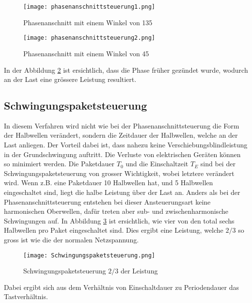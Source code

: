 \begin{figure}[ht!]
	\centering
	\texttt{[image: phasenanschnittsteuerung1.png]}	
	\caption{Phasenanschnitt mit einem Winkel von 135\textdegree \cite{Phasenanschnittsteuerung}}\label{fig:Phasenanschnitt1}
\end{figure}
\newpage
\begin{figure}[ht!]
	\centering
	\texttt{[image: phasenanschnittsteuerung2.png]}	
	\caption{Phasenanschnitt mit einem Winkel von 45\textdegree \cite{Phasenanschnittsteuerung}}\label{fig:Phasenanschnitt2}
\end{figure}

In der Abbildung \ref{fig:Phasenanschnitt2} ist ersichtlich, dass die Phase früher gezündet wurde, wodurch an der Last eine grössere Leistung resultiert.



\subsection{Schwingungspaketsteuerung}\label{sec:Schwingungspaketsteuerung}
In diesem Verfahren wird nicht wie bei der Phasenanschnittsteuerung die Form der Halbwellen verändert, sondern die Zeitdauer der Halbwellen, welche an der Last anliegen. Der Vorteil dabei ist, dass nahezu keine Verschiebungsblindleistung in der Grundschwingung auftritt. Die Verluste von elektrischen Geräten können so minimiert werden. Die Paketdauer $T_0$ und die Einschaltzeit $T_E$ sind bei der Schwingungspaketsteuerung von grosser Wichtigkeit, wobei letztere verändert wird. Wenn z.B. eine Paketdauer 10 Halbwellen hat, und 5 Halbwellen eingeschaltet sind, liegt die halbe Leistung über der Last an. Anders als bei der Phasenanschnittsteuerung entstehen bei dieser Ansteuerungsart keine harmonischen Oberwellen, dafür treten aber sub- und zwischenharmonische Schwingungen auf. In Abbildung \ref{fig:Schwingungspaketsteuerung} ist ersichtlich, wie vier von den total sechs Halbwellen pro Paket eingeschaltet sind. Dies ergibt eine Leistung, welche ${2}/{3}$ so gross ist wie die der normalen Netzspannung.

\begin{figure}[ht!]
	\centering
	\texttt{[image: Schwingungspaketsteuerung.png]}	
	\caption{Schwingungspaketsteuerung ${2}/{3}$ der Leistung \cite{Schwingungspaketsteuerung}}\label{fig:Schwingungspaketsteuerung}
\end{figure}

Dabei ergibt sich aus dem Verhältnis von Einschaltdauer zu Periodendauer das Tastverhältnis.

